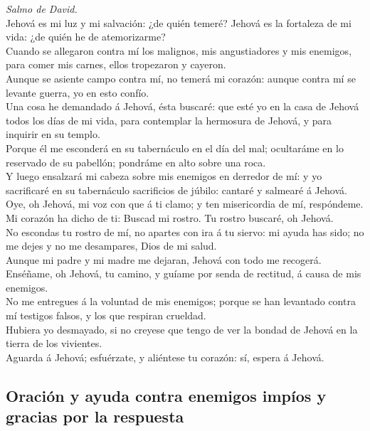  \emph{Salmo de David.}\\
Jehová es mi luz y mi salvación: ¿de quién temeré? Jehová es la
fortaleza de mi vida: ¿de quién he de atemorizarme?\\
 Cuando se allegaron contra mí los malignos, mis
angustiadores y mis enemigos, para comer mis carnes, ellos tropezaron y
cayeron.\\
 Aunque se asiente campo contra mí, no temerá mi corazón:
aunque contra mí se levante guerra, yo en esto confío.\\
 Una cosa he demandado á Jehová, ésta buscaré: que esté yo
en la casa de Jehová todos los días de mi vida, para contemplar la
hermosura de Jehová, y para inquirir en su templo.\\
 Porque él me esconderá en su tabernáculo en el día del mal;
ocultaráme en lo reservado de su pabellón; pondráme en alto sobre una
roca.\\
 Y luego ensalzará mi cabeza sobre mis enemigos en derredor
de mí: y yo sacrificaré en su tabernáculo sacrificios de júbilo: cantaré
y salmearé á Jehová.\\
 Oye, oh Jehová, mi voz con que á ti clamo; y ten
misericordia de mí, respóndeme.\\
 Mi corazón ha dicho de ti: Buscad mi rostro. Tu rostro
buscaré, oh Jehová.\\
 No escondas tu rostro de mí, no apartes con ira á tu
siervo: mi ayuda has sido; no me dejes y no me desampares, Dios de mi
salud.\\
 Aunque mi padre y mi madre me dejaran, Jehová con todo me
recogerá.\\
 Enséñame, oh Jehová, tu camino, y guíame por senda de
rectitud, á causa de mis enemigos.\\
 No me entregues á la voluntad de mis enemigos; porque se
han levantado contra mí testigos falsos, y los que respiran crueldad.\\
 Hubiera yo desmayado, si no creyese que tengo de ver la
bondad de Jehová en la tierra de los vivientes.\\
 Aguarda á Jehová; esfuérzate, y aliéntese tu corazón: sí,
espera á Jehová.

\hypertarget{oraciuxf3n-y-ayuda-contra-enemigos-impuxedos-y-gracias-por-la-respuesta}{%
\subsection{Oración y ayuda contra enemigos impíos y gracias por la
respuesta}\label{oraciuxf3n-y-ayuda-contra-enemigos-impuxedos-y-gracias-por-la-respuesta}}

